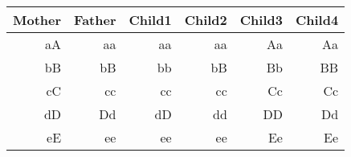 \begin{enumerate}
	\begin{table}[H]
		\centering
		\begin{tabular}{@{}rr|rrrr@{}}
			\toprule
			Mother & Father & Child1 & Child2 & Child3 & Child4 \\ \midrule
			aA     & aa		& aa	 & aa 	  & Aa 	   & Aa   \\
			bB     & bB     & bb	 & bB 	  & Bb 	   & BB    \\
			cC     & cc     & cc	 & cc 	  & Cc 	   & Cc    \\
			dD     & Dd     & dD	 & dd 	  & DD 	   & Dd    \\
			eE     & ee     & ee	 & ee 	  & Ee 	   & Ee    \\ \bottomrule
		\end{tabular}
	\end{table}
	
	
	
\end{enumerate} 